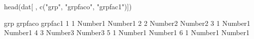 \begin{Schunk}
\begin{Sinput}
  head(dat[  , c("grp", "grpfaco", "grpfac1")])
\end{Sinput}
\begin{Soutput}
  grp grpfaco grpfac1
1   1 Number1 Number1
2   2 Number2 Number2
3   1 Number1 Number1
4   3 Number3 Number3
5   1 Number1 Number1
6   1 Number1 Number1
\end{Soutput}
\end{Schunk}
